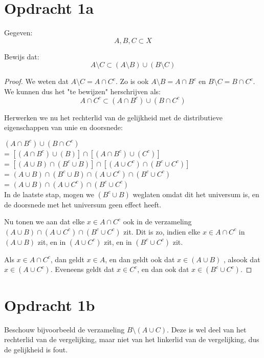 \documentclass[hidequestions]{homework}
\begin{document}
\section*{Opdracht 1a}

Gegeven: 
\[A,B,C \subset X\] 

Bewijs dat: 
\[A \setminus C \subset (A \setminus B) \cup (B \setminus C)
\] 

\begin{proof}

We weten dat $A \setminus C = A \cap C^c$. Zo is ook $A \setminus B = A \cap B^c$ en $B \setminus C = B \cap C^c$. We kunnen dus het "te bewijzen" herschrijven als: 
\[  A \cap C^c \subset (A \cap B^c) \cup (B \cap C^c)\] 

Herwerken we nu het rechterlid van de gelijkheid met de distributieve eigenschappen van unie en doorsnede: 

$(A \cap B^c) \cup (B \cap C^c)$\\
= $[(A \cap B^c) \cup (B )]  \cap   [(A \cap B^c) \cup (C^c)]$ \\
= $[(A \cup B) \cap (B^c \cup B )]   \cap   [  (A  \cup C^c) \cap (B^c \cup C^c)   ]$ \\
= $ (A \cup B) \cap (B^c \cup B ) \cap  (A \cup C^c) \cap (B^c \cup C^c) $ \\
= $ (A \cup B) \cap  (A \cup C^c) \cap (B^c \cup C^c) $ \\
In de laatste stap, mogen we $(B^c \cup B )$ weglaten omdat dit het universum is, en de doorsnede met het universum geen effect heeft. 

Nu tonen we aan dat  elke $x \in A \cap C^c$ ook in de verzameling $ (A \cup B) \cap  (A \cup C^c) \cap (B^c \cup C^c) $ zit. Dit is zo, indien elke 
$x \in A \cap C^c$ in $ (A \cup B)$ zit, en in $ (A \cup C^c) $ zit, en in $ (B^c \cup C^c) $ zit. 

Als $x \in A \cap C^c$, dan geldt $x \in A$, en dan geldt ook dat $x \in (A \cup B)$ , alsook dat $x \in (A \cup C^c)$.
Eveneens geldt dat $x \in C^c$, en dan ook dat $x \in (B^c \cup C^c) $. 

\end{proof}


\section*{Opdracht 1b}

Beschouw bijvoorbeeld de verzameling $B \setminus (A \cup C)$. Deze is wel deel van het rechterlid van de vergelijking, maar niet van het linkerlid van de vergelijking, dus de gelijkheid is fout. 
\end{document}
